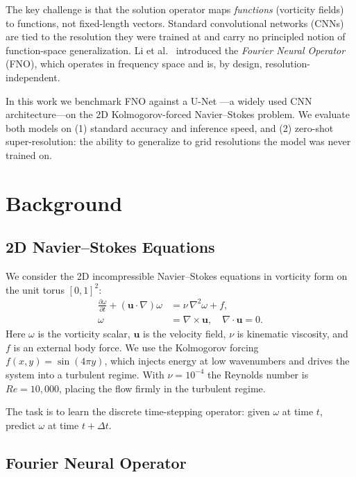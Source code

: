 \documentclass[sigconf,nonacm]{acmart}
\begin{document}
The key challenge is that the solution operator maps \emph{functions} (vorticity
fields) to functions, not fixed-length vectors.
Standard convolutional networks (CNNs) are tied to the resolution they were
trained at and carry no principled notion of function-space generalization.
Li et al.\ \cite{li2021fno} introduced the \emph{Fourier Neural Operator} (FNO),
which operates in frequency space and is, by design, resolution-independent.

In this work we benchmark FNO against a U-Net \cite{ronneberger2015unet}---a
widely used CNN architecture---on the 2D Kolmogorov-forced Navier--Stokes
problem.
We evaluate both models on (1) standard accuracy and inference speed, and (2)
zero-shot super-resolution: the ability to generalize to grid resolutions the
model was never trained on.

\section{Background}
\label{sec:background}

\subsection{2D Navier--Stokes Equations}

We consider the 2D incompressible Navier--Stokes equations in vorticity form on
the unit torus $[0,1]^2$:
\begin{align}
  \frac{\partial \omega}{\partial t} + (\mathbf{u} \cdot \nabla)\omega
    &= \nu\,\nabla^2 \omega + f, \label{eq:ns}\\
  \omega &= \nabla \times \mathbf{u}, \quad \nabla \cdot \mathbf{u} = 0.
\end{align}
Here $\omega$ is the vorticity scalar, $\mathbf{u}$ is the velocity field, $\nu$
is kinematic viscosity, and $f$ is an external body force.
We use the Kolmogorov forcing $f(x,y) = \sin(4\pi y)$, which injects energy at
low wavenumbers and drives the system into a turbulent regime.
With $\nu = 10^{-4}$ the Reynolds number is $Re = 10{,}000$, placing the flow
firmly in the turbulent regime.

The task is to learn the discrete time-stepping operator: given $\omega$ at time
$t$, predict $\omega$ at time $t + \Delta t$.

\subsection{Fourier Neural Operator}
\end{document}
